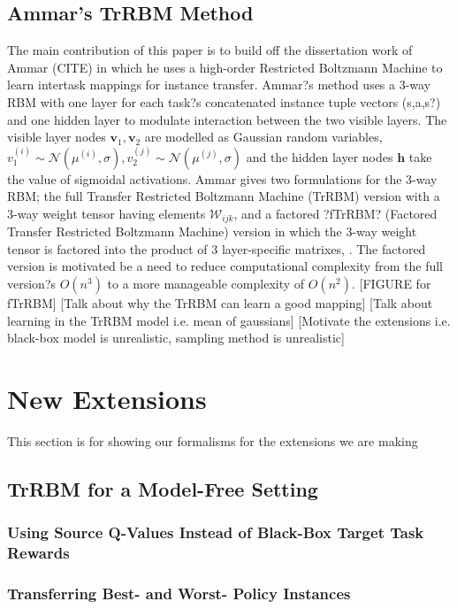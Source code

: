 \documentclass{article}
\begin{document}
\subsection{Ammar's TrRBM Method}

The main contribution of this paper is to build off the dissertation work of Ammar (CITE) in which he uses a high-order Restricted Boltzmann Machine to learn intertask mappings for instance transfer. Ammar?s method uses a 3-way RBM with one layer for each task?s concatenated instance tuple vectors (s,a,s?) and one hidden layer to modulate interaction between the two visible layers. The visible layer nodes $\mathbf{v}_{1}, \mathbf{v}_{2}$ are modelled as Gaussian random variables, $v_{1}^{(i)} \sim \mathcal{N}(\mu^{(i)}, \sigma),  v_{2}^{(j)} \sim \mathcal{N}(\mu^{(j)}, \sigma)$ and the hidden layer nodes $\mathbf{h}$ take the value of sigmoidal activations. Ammar gives two formulations for the 3-way RBM; the full Transfer Restricted Boltzmann Machine (TrRBM) version with a 3-way weight tensor having elements $\mathcal{W}_{ijk}$, and a factored ?fTrRBM? (Factored Transfer Restricted Boltzmann Machine) version in which the 3-way weight tensor is factored into the product of 3 layer-specific matrixes, . The factored version is motivated be a need to reduce computational complexity from the full version?s $O(n^{3})$ to a more manageable complexity of $O(n^{2})$. 
	[FIGURE for fTrRBM]
	[Talk about why the TrRBM can learn a good mapping]
	[Talk about learning in the TrRBM model i.e. mean of gaussians]
	[Motivate the extensions i.e. black-box model is unrealistic, sampling method is unrealistic]


\section{New Extensions}

This section is for showing our formalisms for the extensions we are making

\subsection{TrRBM for a Model-Free Setting}

\subsubsection{Using Source Q-Values Instead of Black-Box Target Task Rewards}

\subsubsection{Transferring Best- and Worst- Policy Instances}
\end{document}
